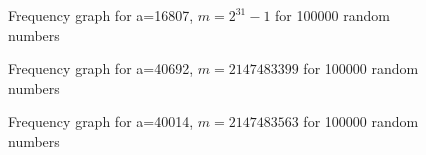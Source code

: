 \documentclass[11pt]{article}
\begin{document}
\begin{figure}[H]
	\centering
	\caption{Frequency graph for a=16807, $m=2^{31}-1$ for 100000 random numbers}
\end{figure}
\begin{figure}[H]
	\centering
	\caption{Frequency graph for a=40692, $m=2147483399$ for 100000 random numbers}
\end{figure}
\begin{figure}[H]
	\centering
	\caption{Frequency graph for a=40014, $m=2147483563$ for 100000 random numbers}
\end{figure}
\end{document}
